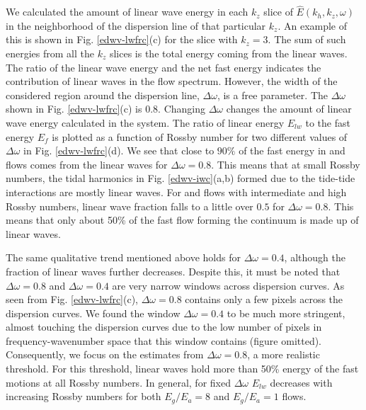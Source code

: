 \documentclass[../Rajarshi-thesis-draft.tex]{subfiles}
\begin{document}
    We calculated the amount of linear wave energy in each $k_z$ slice of $\hat{E}(k_h,k_z,\omega)$ in the neighborhood of the dispersion line of that particular $k_z$. An example of this is shown in Fig. \ref{edwv-lwfrc}(c) for the slice with $k_z = 3$. The sum of such energies from all the $k_z$ slices is the total energy coming from the linear waves. The ratio of the linear wave energy and the net fast energy indicates  the contribution of  linear waves in the flow spectrum. However, the width of the considered region around the dispersion line, $\Delta \omega$, is a free parameter. The $\Delta \omega$ shown in Fig. \ref{edwv-lwfrc}(c) is $0.8$. Changing $\Delta \omega$ changes the amount of  linear wave energy calculated in the system. The ratio of linear energy $E_{lw}$ to the fast energy $E_f$ is plotted as a function of Rossby number for two different values of $\Delta \omega$ in Fig. \ref{edwv-lwfrc}(d). We see that close to $90\%$ of the fast energy in \lre and \lro flows comes from the linear waves for $\Delta \omega = 0.8$. This means that at small Rossby numbers, the tidal harmonics in Fig. \ref{edwv-iwc}(a,b) formed due to the tide-tide interactions are mostly linear waves. For \ir and \hr flows with intermediate and high Rossby numbers, linear wave fraction falls to a little over $0.5$ for $\Delta\omega = 0.8$. This means that only about 50\% of the fast flow forming the continuum is made up of linear waves. 
    
    The same qualitative trend mentioned  above holds  for $\Delta \omega = 0.4$, although the fraction of linear waves further decreases. %
    Despite this, it must be noted that  $\Delta \omega = 0.8$ and  $\Delta \omega = 0.4$ are very narrow windows across dispersion curves. As seen from Fig. \ref{edwv-lwfrc}(c), $\Delta \omega = 0.8$ contains only a few pixels across the dispersion curves. We found the window $\Delta \omega = 0.4$ to be much more stringent, almost touching the dispersion curves  due to the low number of pixels in frequency-wavenumber space that this window contains (figure omitted).  %
    Consequently,  we focus on the estimates from   $\Delta \omega = 0.8$, a more realistic threshold. For this threshold, linear waves hold more than 50\% energy of the fast motions at all Rossby numbers. In general, for fixed $\Delta\omega$ $E_{lw}$ decreases with increasing Rossby numbers for both $E_g/E_a = 8$ and $E_g/E_a = 1$ flows.
       
\end{document}

